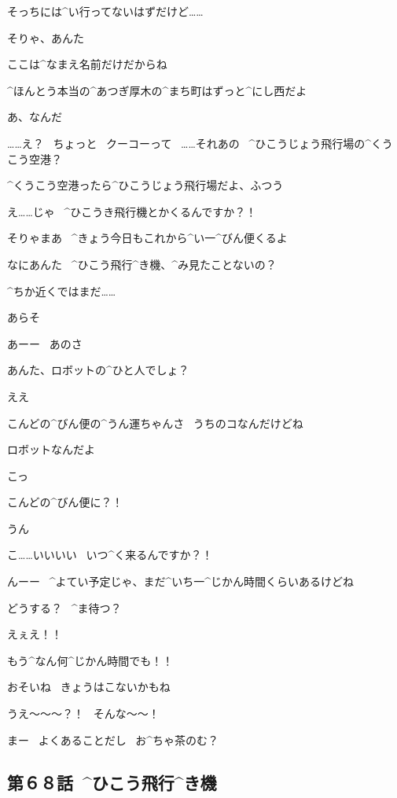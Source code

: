 \Alpha そっちには^{い}{行}ってないはずだけど……

\Person そりゃ、あんた

\Person ここは^{なまえ}{名前}だけだからね

\Person ^{ほんとう}{本当}の^{あつぎ}{厚木}の^{まち}{町}はずっと^{にし}{西}だよ

\Alpha あ、なんだ

\Alpha ……え？
\ ちょっと
\ クーコーって
\ ……それあの
\ ^{ひこうじょう}{飛行場}の^{くうこう}{空港}？

\Person ^{くうこう}{空港}ったら^{ひこうじょう}{飛行場}だよ、ふつう

\page[32]
\Alpha え……じゃ
\ ^{ひこうき}{飛行機}とかくるんですか？！

\Person そりゃまあ
\ ^{きょう}{今日}もこれから^{い}{一}^{びん}{便}くるよ

\Person なにあんた
\ ^{ひこう}{飛行}^{き}{機}、^{み}{見}たことないの？

\Alpha ^{ちか}{近}くではまだ……

\Person あらそ

\Person あーー
\ あのさ

\page[33]
\Person あんた、ロボットの^{ひと}{人}でしょ？

\Alpha ええ

\Person こんどの^{びん}{便}の^{うん}{運}ちゃんさ
\ うちのコなんだけどね

\Person ロボットなんだよ

\Alpha こっ

\Alpha こんどの^{びん}{便}に？！

\Person うん

\page[34]
\Alpha こ……いいいい
\ いつ^{く}{来}るんですか？！

\Person んーー
\ ^{よてい}{予定}じゃ、まだ^{いち}{一}^{じかん}{時間}くらいあるけどね

\Person どうする？
\ ^{ま}{待}つ？

\Alpha えぇえ！！

\Alpha もう^{なん}{何}^{じかん}{時間}でも！！

\page[36]
\Person おそいね
\ きょうはこないかもね

\Alpha うえ〜〜〜？！
\ そんな〜〜！

\Person まー
\ よくあることだし
\ お^{ちゃ}{茶}のむ？


\subsection{第６８話\ ^{ひこう}{飛行}^{き}{機}}

